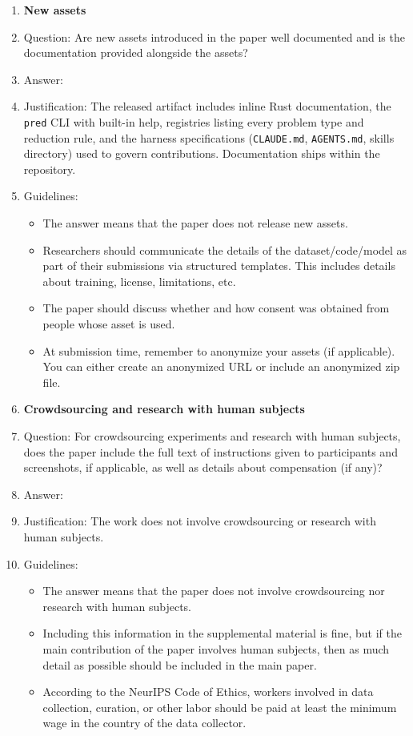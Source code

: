 \begin{enumerate}
\item {\bf New assets}
    \item[] Question: Are new assets introduced in the paper well documented and is the documentation provided alongside the assets?
    \item[] Answer: \answerYes{}
    \item[] Justification: The released artifact includes inline Rust documentation, the \texttt{pred} CLI with built-in help, registries listing every problem type and reduction rule, and the harness specifications (\texttt{CLAUDE.md}, \texttt{AGENTS.md}, skills directory) used to govern contributions. Documentation ships within the repository.
    \item[] Guidelines:
    \begin{itemize}
        \item The answer \answerNA{} means that the paper does not release new assets.
        \item Researchers should communicate the details of the dataset\slash code\slash model as part of their submissions via structured templates. This includes details about training, license, limitations, etc.
        \item The paper should discuss whether and how consent was obtained from people whose asset is used.
        \item At submission time, remember to anonymize your assets (if applicable). You can either create an anonymized URL or include an anonymized zip file.
    \end{itemize}

\item {\bf Crowdsourcing and research with human subjects}
    \item[] Question: For crowdsourcing experiments and research with human subjects, does the paper include the full text of instructions given to participants and screenshots, if applicable, as well as details about compensation (if any)?
    \item[] Answer: \answerNA{}
    \item[] Justification: The work does not involve crowdsourcing or research with human subjects.
    \item[] Guidelines:
    \begin{itemize}
        \item The answer \answerNA{} means that the paper does not involve crowdsourcing nor research with human subjects.
        \item Including this information in the supplemental material is fine, but if the main contribution of the paper involves human subjects, then as much detail as possible should be included in the main paper.
        \item According to the NeurIPS Code of Ethics, workers involved in data collection, curation, or other labor should be paid at least the minimum wage in the country of the data collector.
    \end{itemize}


\end{enumerate}
